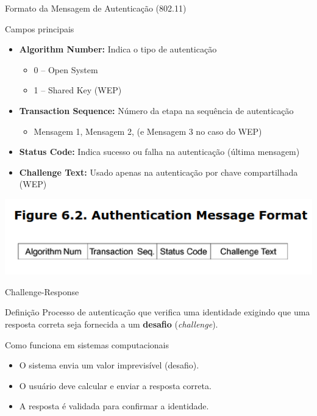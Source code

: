 \begin{frame}{Formato da Mensagem de Autenticação (802.11)}
\begin{block}{Campos principais}
\begin{itemize}
    \item \textbf{Algorithm Number:} Indica o tipo de autenticação
    \begin{itemize}
        \item 0 – Open System
        \item 1 – Shared Key (WEP)
    \end{itemize}
    \item \textbf{Transaction Sequence:} Número da etapa na sequência de autenticação
    \begin{itemize}
        \item Mensagem 1, Mensagem 2, (e Mensagem 3 no caso do WEP)
    \end{itemize}
    \item \textbf{Status Code:} Indica sucesso ou falha na autenticação (última mensagem)
    \item \textbf{Challenge Text:} Usado apenas na autenticação por chave compartilhada (WEP)
\end{itemize}
\end{block}



\centering
  \includegraphics[width=0.55\linewidth]{Figuras/wep-authentication-message.png}



\end{frame}



\begin{frame}{Challenge-Response}
\begin{block}{Definição}
Processo de autenticação que verifica uma identidade exigindo que uma resposta correta seja fornecida a um \textbf{desafio} (\textit{challenge}).
\end{block}

\begin{block}{Como funciona em sistemas computacionais}
\begin{itemize}
    \item O sistema envia um valor imprevisível (desafio).
    \item O usuário deve calcular e enviar a resposta correta.
    \item A resposta é validada para confirmar a identidade.
\end{itemize}
\end{block}
\end{frame}


